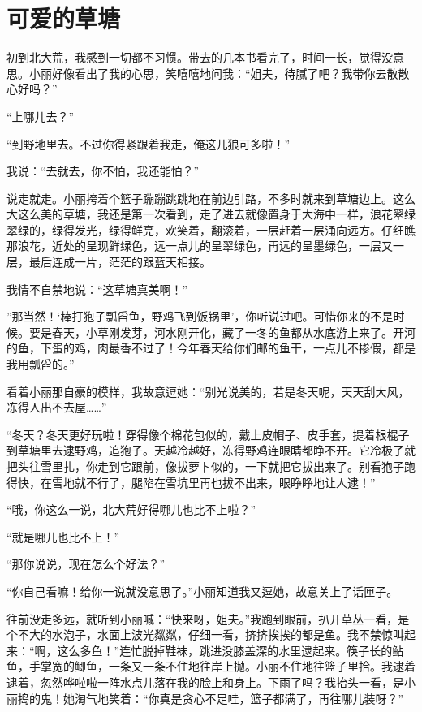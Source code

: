 \documentclass[12pt,UTF-8,openany]{ctexbook}
\begin{document}
\chapter{可爱的草塘}

\begin{Large}
    
    初到北大荒，我感到一切都不习惯。带去的几本书看完了，时间一长，觉得没意思。小丽好像看出了我的心思，笑嘻嘻地问我：“姐夫，待腻了吧？我带你去散散心好吗？”
    
    “上哪儿去？”
    
    “到野地里去。不过你得紧跟着我走，俺这儿狼可多啦！”
    
    我说：“去就去，你不怕，我还能怕？”
    
    说走就走。小丽挎着个篮子蹦蹦跳跳地在前边引路，不多时就来到草塘边上。这么大这么美的草塘，我还是第一次看到，走了进去就像置身于大海中一样，浪花翠绿翠绿的，绿得发光，绿得鲜亮，欢笑着，翻滚着，一层赶着一层涌向远方。仔细瞧那浪花，近处的呈现鲜绿色，远一点儿的呈翠绿色，再远的呈墨绿色，一层又一层，最后连成一片，茫茫的跟蓝天相接。
    
    我情不自禁地说：“这草塘真美啊！”
    
    ”那当然！‘棒打狍子瓢舀鱼，野鸡飞到饭锅里’，你听说过吧。可惜你来的不是时候。要是春天，小草刚发芽，河水刚开化，藏了一冬的鱼都从水底游上来了。开河的鱼，下蛋的鸡，肉最香不过了！今年春天给你们邮的鱼干，一点儿不掺假，都是我用瓢舀的。”
    
    看着小丽那自豪的模样，我故意逗她：“别光说美的，若是冬天呢，天天刮大风，冻得人出不去屋……”
    
    “冬天？冬天更好玩啦！穿得像个棉花包似的，戴上皮帽子、皮手套，提着根棍子到草塘里去逮野鸡，追狍子。天越冷越好，冻得野鸡连眼睛都睁不开。它冷极了就把头往雪里扎，你走到它跟前，像拔萝卜似的，一下就把它拔出来了。别看狍子跑得快，在雪地就不行了，腿陷在雪坑里再也拔不出来，眼睁睁地让人逮！”
    
    “哦，你这么一说，北大荒好得哪儿也比不上啦？”
    
    “就是哪儿也比不上！”
    
    “那你说说，现在怎么个好法？”
    
    “你自己看嘛！给你一说就没意思了。”小丽知道我又逗她，故意关上了话匣子。
    
    往前没走多远，就听到小丽喊：“快来呀，姐夫。”我跑到眼前，扒开草丛一看，是个不大的水泡子，水面上波光粼粼，仔细一看，挤挤挨挨的都是鱼。我不禁惊叫起来：“啊，这么多鱼！”连忙脱掉鞋袜，跳进没膝盖深的水里逮起来。筷子长的鲇鱼，手掌宽的鲫鱼，一条又一条不住地往岸上抛。小丽不住地往篮子里拾。我逮着逮着，忽然哗啦啦一阵水点儿落在我的脸上和身上。下雨了吗？我抬头一看，是小丽捣的鬼！她淘气地笑着：“你真是贪心不足哇，篮子都满了，再往哪儿装呀？”
    

\end{Large}
\end{document}

